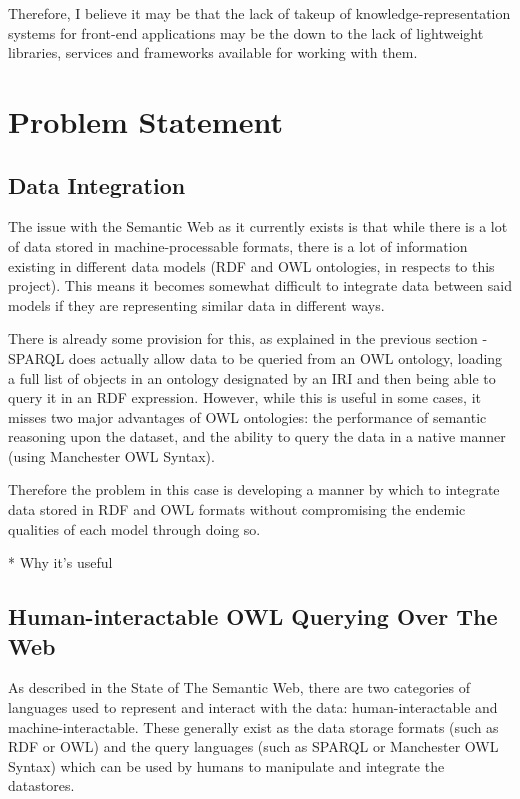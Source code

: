 \documentclass{article}
\begin{document}
Therefore, I believe it may be that the lack of takeup of knowledge-representation systems
for front-end applications may be the down to the lack of lightweight libraries, 
services and frameworks available for working with them.

\section{Problem Statement}

\subsection{Data Integration}

The issue with the Semantic Web as it currently exists is that while there is a
lot of data stored in machine-processable formats, there is a lot of information 
existing in different data models (RDF and OWL ontologies, in respects to this project). 
This means it becomes somewhat difficult to integrate data between said models 
if they are representing similar data in different ways.

There is already some provision for this, as explained in the previous section - 
SPARQL does actually allow data to be queried from an OWL ontology, loading a full 
list of objects in an ontology designated by an IRI and then being able to query 
it in an RDF expression. However, while this is useful in some cases, it misses 
two major advantages of OWL ontologies: the performance of semantic reasoning
upon the dataset, and the ability to query the data in a native manner (using 
Manchester OWL Syntax).

Therefore the problem in this case is developing a manner by which to integrate
data stored in RDF and OWL formats without compromising the endemic qualities of 
each model through doing so.

* Why it's useful

\subsection{Human-interactable OWL Querying Over The Web}

As described in the State of The Semantic Web, there are two categories of
languages used to represent and interact with the data: human-interactable and
machine-interactable. These generally exist as the data storage formats (such as
RDF or OWL) and the query languages (such as SPARQL or Manchester OWL Syntax)
which can be used by humans to manipulate and integrate the datastores.
\end{document}
